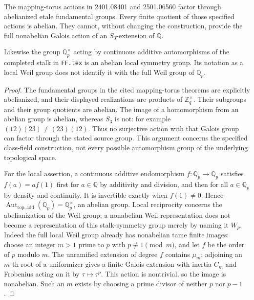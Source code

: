 \begin{proposition}
\label{AC-G20}
The mapping-torus actions in 2401.08401 and 2501.06560 factor through
abelianized etale fundamental groups.  Every finite quotient of those
specified actions is abelian.  They cannot, without changing the
construction, provide the full nonabelian Galois action of an
$S_3$-extension of $\mathbb Q$.

Likewise the group $\mathbb Q_p^\times$ acting by continuous additive
automorphisms of the completed stalk in \texttt{FF.tex} is an
abelian local symmetry group.  Its notation as a local Weil group
does not identify it with the full Weil group of $\mathbb Q_p$.
\end{proposition}
\begin{proof}
The fundamental groups in the cited mapping-torus theorems are
explicitly abelianized, and their displayed realizations are products
of $\mathbb Z_q^\times$.  Their subgroups and their group quotients
are abelian.  The image of a homomorphism from an abelian group is
abelian, whereas $S_3$ is not: for example $(12)(23)\ne(23)(12)$.
Thus no surjective action with that Galois group can factor through
the stated source group.  This argument concerns the specified
class-field construction, not every possible automorphism group of
the underlying topological space.

For the local assertion, a continuous additive endomorphism
$f:\mathbb Q_p\to\mathbb Q_p$ satisfies $f(a)=a f(1)$ first for
$a\in\mathbb Q$ by additivity and division, and then for all
$a\in\mathbb Q_p$ by density and continuity.  It is invertible
exactly when $f(1)\ne0$.  Hence
$\operatorname{Aut}_{\mathrm{top,add}}(\mathbb Q_p)
=\mathbb Q_p^\times$, an abelian group.  Local reciprocity concerns
the abelianization of the Weil group; a nonabelian Weil representation
does not become a representation of this stalk-symmetry group merely
by naming it $W_p$.
Indeed the full local Weil group already has nonabelian tame finite
images: choose an integer $m>1$ prime to $p$ with
$p\not\equiv1\pmod m$, and let $f$ be the order of $p$ modulo $m$.
The unramified extension of degree $f$ contains $\mu_m$; adjoining an
$m$-th root of a uniformizer gives a finite Galois extension with
inertia $C_m$ and Frobenius acting on it by $\tau\mapsto\tau^p$.
This action is nontrivial, so the image is nonabelian.  Such an $m$
exists by choosing a prime divisor of neither $p$ nor $p-1$.
\end{proof}

